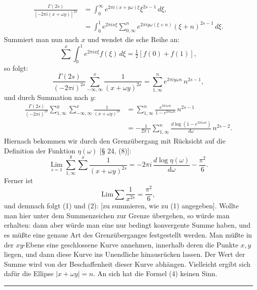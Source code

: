 
\[
\begin{aligned}
\frac{\Gamma(2s)}{[-2\pi i(x+\omega y)]^{2s}} &= \int_0^\infty e^{2\pi i(x+y\omega)\xi}\xi^{2s-1}\,d\xi,\\
&= \int_0^1 e^{2\pi i x\xi}\sum_{0,\infty}^n e^{2\pi i y\omega(\xi+n)}(\xi+n)^{2s-1}\,d\xi.
\end{aligned}
\]
Summiert man nun nach $x$ und wendet die sche Reihe an:
\[
\sum^x \int_0^1 e^{2\pi i x\xi} f(\xi)\,d\xi = \tfrac{1}{2}[f(0)+f(1)],
\]
so folgt:
\[
\frac{\Gamma(2s)}{(-2\pi i)^{2s}} \sum_{-\infty,\infty}^x \frac{1}{(x+\omega y)^{2s}} = \sum_{1,\infty}^n e^{2\pi i y\omega n}\,n^{2s-1},
\]
und durch Summation nach $y$:
\[
\begin{aligned}
\frac{\Gamma(2s)}{(-2\pi i)^{2s}} \sum_{1,\infty}^y \sum_{-\infty,\infty}^x \frac{1}{(x+\omega y)^{2s}} &= \sum_{1,\infty}^n \frac{e^{2\pi i\omega n}}{1-e^{2\pi i\omega n}}\,n^{2s-1}\\
&= -\frac{1}{2\pi \imath}\sum_{1,\infty}^n \frac{d\log(1-e^{2\pi i\omega n})}{d\omega}\,n^{2s-2}.
\end{aligned}
\]
Hiernach bekommen wir durch den Grenzübergang mit Rücksicht auf die Definition der Funktion $\eta(\omega)$ [§ 24, (8)]:
\[
\mathop{\mathrm{Lim}}\limits_{s=1}\sum_{1,\infty}^y \sum^x \frac{1}{(x+\omega y)^{2s}} = -2\pi i\,\frac{d\log\eta(\omega)}{d\omega} - \frac{\pi^2}{6}.
\]
Ferner ist
\[
\mathrm{Lim}\sum \frac{1}{x^{2s}} = \frac{\pi^2}{6},
\]
und demnach folgt (1) und (2):
[zu summieren, wie zu (1) angegeben]. Wollte man hier unter dem Summenzeichen zur Grenze übergehen, so würde man erhalten:
dann aber würde man eine nur bedingt konvergente Summe haben, und es müßte eine genaue Art des Grenzüberganges festgestellt werden. Man müßte in der $xy$-Ebene eine geschlossene Kurve annehmen, innerhalb deren die Punkte $x, y$ liegen, und dann diese Kurve ins Unendliche hinausrücken lassen. Der Wert der Summe wird von der Beschaffenheit dieser Kurve abhängen. Vielleicht ergibt sich dafür die Ellipse $|x+\omega y| = n$. An sich hat die Formel (4) keinen Sinn.

\begin{center}\rule{3cm}{0.4pt}\end{center}
